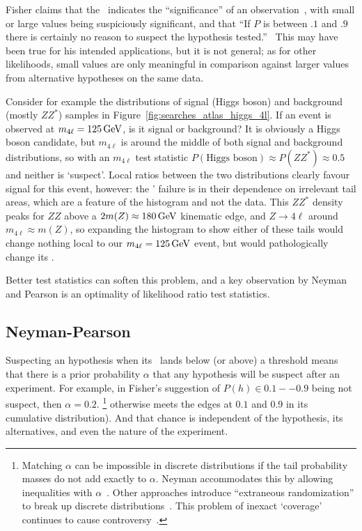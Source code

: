 Fisher claims that the \pvalue\ indicates the ``significance'' of an
observation~\cite{fisher1925smrw}, with small or large values being
suspiciously significant, and that
``If $P$ is between $.1$ and $.9$ there is certainly no reason to suspect the
hypothesis tested.''~\cite{fisher1925smrw}
This may have been true for his intended applications, but it is not general;
as for other likelihoods, small values are only meaningful in comparison
against larger values from alternative hypotheses on the same data.

Consider for example the distributions of signal (Higgs boson) and background
(mostly $ZZ^*$) samples in Figure~\ref{fig:searches_atlas_higgs_4l}.
If an event is observed at $m_{4\ell} = 125\,\eV[G]$, is it signal or
background?
It is obviously a Higgs boson candidate, but $m_{4\ell}$ is around the middle
of both signal and background distributions, so with an $m_{4\ell}$ test
statistic $P(\textrm{Higgs boson}) \approx P(ZZ^*) \approx 0.5$ and neither
is `suspect'.
Local ratios between the two distributions clearly favour signal for this
event, however:
the \pvalues' failure is in their dependence on irrelevant tail areas,
which are a feature of the histogram and not the data.
This $ZZ^*$ density peaks for $ZZ$ above a
$2 m(Z) \approx 180\,\eV[G]$ kinematic edge,
and $Z \to 4\ell$ around $m_{4\ell} \approx m(Z)$,
so expanding the histogram to show either of these tails would change nothing
local to our $m_{4\ell} = 125\,\eV[G]$ event, but would pathologically change
its \pvalues.

Better test statistics can soften this problem, and a key observation by
Neyman and Pearson is an optimality of likelihood ratio test statistics.


\subsection{Neyman-Pearson}
\label{sec:searches_np}
Suspecting an hypothesis when its \pvalue\ lands below (or above) a threshold
means that there is a prior probability $\alpha$ that any hypothesis will be
suspect after an experiment.
For example, in Fisher's suggestion of $P(h) \in 0.1--0.9$ being not suspect,
then $\alpha = 0.2$.%
\footnote{%
Matching $\alpha$ can be impossible in discrete distributions if
the tail probability masses do not add exactly to $\alpha$.
Neyman accommodates this by allowing inequalities with $\alpha$~\cite{
neyman1935Intervals
}.
Other approaches introduce ``extraneous randomization'' to
break up discrete distributions~\cite{tocher1950discontinuous}.
This problem of inexact `coverage' continues to cause controversy~\cite{
Read2002cls,
Feldman:1997qc,
cousins2008evaluation,
Cranmer2006Statistical
}.%
}
otherwise meets the edges at $0.1$ and $0.9$ in its cumulative distribution).
And that chance is independent of the hypothesis, its alternatives, and even
the nature of the experiment.

